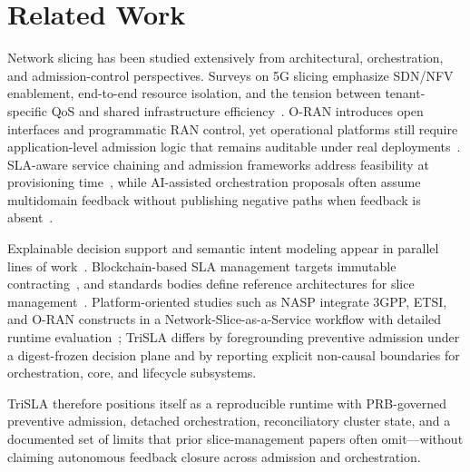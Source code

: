 \documentclass[journal]{IEEEtran}
\begin{document}
\section{Related Work}
Network slicing has been studied extensively from architectural, orchestration, and admission-control perspectives. Surveys on 5G slicing emphasize SDN/NFV enablement, end-to-end resource isolation, and the tension between tenant-specific QoS and shared infrastructure efficiency~\cite{Afolabi2018SlicingSurvey,OrdonezLucena2017Slicing,Foukas2017Survey,Li2021E2E}. O-RAN introduces open interfaces and programmatic RAN control, yet operational platforms still require application-level admission logic that remains auditable under real deployments~\cite{Polese2022ORAN,oran_open_smart_ran,oran-survey-2023}. SLA-aware service chaining and admission frameworks address feasibility at provisioning time~\cite{Orfanos2020SFC,Sun2022SLAAdmission,Bega2021Admission,Xu2020AIAdmission}, while AI-assisted orchestration proposals often assume multidomain feedback without publishing negative paths when feedback is absent~\cite{ahmad2023ai,sharma2022aiempowered,ai-orch-2023}.

Explainable decision support and semantic intent modeling appear in parallel lines of work~\cite{Guidotti2018XAI,xai-survey,Gruber1993,Studer1998}. Blockchain-based SLA management targets immutable contracting~\cite{Zhang2020Blockchain,Ferreira2022BlockchainSLA,Javed2024Review,bao2022blockchain,choi2023slaver}, and standards bodies define reference architectures for slice management~\cite{3GPP2020NRM,3gpp28541,ETSI2021ZSM,gsma_ng116}. Platform-oriented studies such as NASP integrate 3GPP, ETSI, and O-RAN constructs in a Network-Slice-as-a-Service workflow with detailed runtime evaluation~\cite{grings2025nasp}; TriSLA differs by foregrounding preventive admission under a digest-frozen decision plane and by reporting explicit non-causal boundaries for orchestration, core, and lifecycle subsystems.

TriSLA therefore positions itself as a reproducible runtime with PRB-governed preventive admission, detached orchestration, reconciliatory cluster state, and a documented set of limits that prior slice-management papers often omit—without claiming autonomous feedback closure across admission and orchestration.


\end{document}
